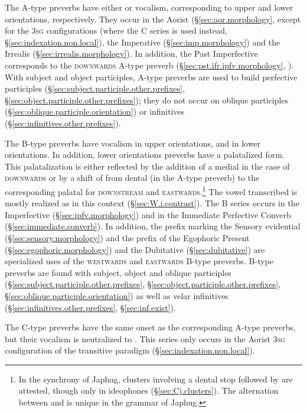 The A-type preverbs have either  or  vocalism, corresponding to upper and lower orientations, respectively. They occur in the Aorist (§\ref{sec:aor.morphology}, except for the \textsc{3sg}\flobv{} configurations (where the C series is used instead, §\ref{sec:indexation.non.local}), the Imperative (§\ref{sec:imp.morphology}) and the Irrealis (§\ref{sec:irrealis.morphology}). In addition, the Past Imperfective  corresponds to the \textsc{downwards} A-type preverb (§\ref{sec:pst.ifr.ipfv.morphology}, \citealt{lin11direction}). With subject and object participles, A-type preverbs are used to build perfective participles (§\ref{sec:subject.participle.other.prefixes}, §\ref{sec:object.participle.other.prefixes}); they do not occur on oblique participles (§\ref{sec:oblique.participle.orientation}) or infinitives (§\ref{sec:infinitives.other.prefixes}).

The B-type preverbs have  vocalism in upper orientations, and  in lower orientations. In addition, lower orientations preverbs have a palatalized form. This palatalization is either reflected by the addition of a  medial in the case of  \textsc{downwards} or by a shift of from dental (in the A-type preverb) to the corresponding palatal for  \textsc{downstream} and  \textsc{eastwards}.\footnote{In the synchrony of Japhug, clusters involving a dental stop followed by  are attested, though only in ideophones (§\ref{sec:Cj.clusters}).  The alternation between  and  is unique in the grammar of Japhug. } The vowel transcribed  is mostly realized as  in this context (§\ref{sec:W.i.contrast}). The B series occurs in the Imperfective (§\ref{sec:ipfv.morphology}) and in the Immediate Perfective Converb (§\ref{sec:immediate.converb}). In addition, the  prefix marking the Sensory  evidential (§\ref{sec:sensory.morphology}) and the  prefix of the Egophoric Present (§\ref{sec:egophoric.morphology}) and the Dubitative (§\ref{sec:dubitative}) are specialized uses of the \textsc{westwards} and \textsc{eastwards} B-type preverbs. B-type preverbs are found with subject, object and oblique participles (§\ref{sec:subject.participle.other.prefixes}, §\ref{sec:object.participle.other.prefixes}, §\ref{sec:oblique.participle.orientation}) as well as velar infinitives (§\ref{sec:infinitives.other.prefixes}, §\ref{sec:inf.exist}).

The C-type preverbs have the same onset as the corresponding A-type preverbs, but their vocalism is neutralized to . This series only occurs in the Aorist \textsc{3sg}\flobv{} configuration of the transitive paradigm (§\ref{sec:indexation.non.local}).


